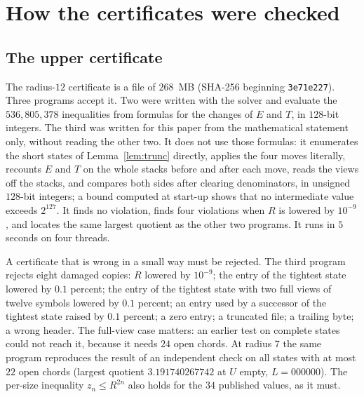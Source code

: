\section{How the certificates were checked}\label{sec:checks}

\subsection{The upper certificate}

The radius-$12$ certificate is a file of $268$~MB (SHA-256 beginning \texttt{3e71e227}). Three programs accept it.
Two were written with the solver and evaluate the $536{,}805{,}378$ inequalities from formulas for the changes of $E$
and $T$, in $128$-bit integers. The third was written for this paper from the mathematical statement only, without
reading the other two. It does not use those formulas: it enumerates the short states of Lemma~\ref{lem:trunc}
directly, applies the four moves literally, recounts $E$ and $T$ on the whole stacks before and after each move, reads
the views off the stacks, and compares both sides after clearing denominators, in unsigned $128$-bit integers; a
bound computed at start-up shows that no intermediate value exceeds $2^{127}$. It finds no violation, finds four
violations when $R$ is lowered by $10^{-9}$, and locates the same largest quotient as the other two programs. It runs
in $5$ seconds on four threads.

A certificate that is wrong in a small way must be rejected. The third program rejects eight damaged copies: $R$
lowered by $10^{-9}$; the entry of the tightest state lowered by $0.1$ percent; the entry of the tightest state with
two full views of twelve symbols lowered by $0.1$ percent; an entry used by a successor of the tightest state raised
by $0.1$ percent; a zero entry; a truncated file; a trailing byte; a wrong header. The full-view case matters: an
earlier test on complete states could not reach it, because it needs $24$ open chords. At radius $7$ the same program
reproduces the result of an independent check on all states with at most $22$ open chords (largest quotient
$3.191740267742$ at $U$ empty, $L=000000$). The per-size inequality $z_n\le R^{2n}$ also holds for the $34$
published values, as it must.

